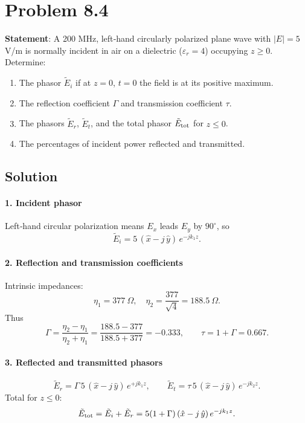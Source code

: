 \section*{Problem 8.4}
\textbf{Statement}: A 200 MHz, left‐hand circularly polarized plane wave with $|E|=5\,$V/m is normally incident in air on a dielectric ($\varepsilon_r=4$) occupying $z\ge0$. Determine:
\begin{enumerate}
  \item The phasor $\tilde E_i$ if at $z=0$, $t=0$ the field is at its positive maximum.
  \item The reflection coefficient $\Gamma$ and transmission coefficient $\tau$.
  \item The phasors $\tilde E_r$, $\tilde E_t$, and the total phasor $\tilde E_{\rm tot}$ for $z\le0$.
  \item The percentages of incident power reflected and transmitted.
\end{enumerate}

\subsection*{Solution}

\paragraph{1. Incident phasor}
Left‐hand circular polarization means $E_x$ leads $E_y$ by $90^\circ$, so
\[
\tilde E_i = 5\,(\hat x - j\,\hat y)\,e^{-j k_1 z}.
\]

\paragraph{2. Reflection and transmission coefficients}
Intrinsic impedances:
\[
\eta_1 = 377\ \Omega,\quad 
\eta_2 = \frac{377}{\sqrt{4}} = 188.5\ \Omega.
\]
Thus
\[
\Gamma = \frac{\eta_2 - \eta_1}{\eta_2 + \eta_1}
       = \frac{188.5 - 377}{188.5 + 377}
       = -0.333,
\qquad
\tau = 1 + \Gamma = 0.667.
\]

\paragraph{3. Reflected and transmitted phasors}
\[
\tilde E_r = \Gamma\,5\,(\hat x - j\,\hat y)\,e^{+j k_1 z},
\qquad
\tilde E_t = \tau\,5\,(\hat x - j\,\hat y)\,e^{-j k_2 z}.
\]
Total for $z\le0$:
\[
\tilde E_{\rm tot} 
= \tilde E_i + \tilde E_r
= 5(1+\Gamma)\,(\hat x - j\,\hat y)\,e^{-j k_1 z}.
\]

